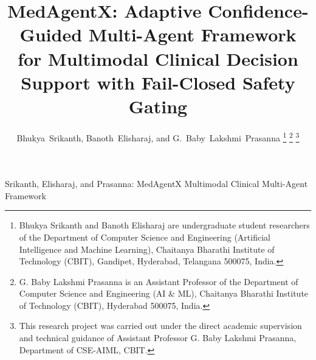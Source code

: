 \documentclass[journal,10pt,twocolumn]{IEEEtran}
\begin{document}
\title{MedAgentX: Adaptive Confidence-Guided Multi-Agent Framework for Multimodal Clinical Decision Support with Fail-Closed Safety Gating}

\author{Bhukya~Srikanth, Banoth~Elisharaj, and G.~Baby~Lakshmi~Prasanna%
\thanks{Bhukya Srikanth and Banoth Elisharaj are undergraduate student researchers of the Department of Computer Science and Engineering (Artificial Intelligence and Machine Learning), Chaitanya Bharathi Institute of Technology (CBIT), Gandipet, Hyderabad, Telangana 500075, India.}%
\thanks{G. Baby Lakshmi Prasanna is an Assistant Professor of the Department of Computer Science and Engineering (AI \& ML), Chaitanya Bharathi Institute of Technology (CBIT), Hyderabad 500075, India.}%
\thanks{This research project was carried out under the direct academic supervision and technical guidance of Assistant Professor G. Baby Lakshmi Prasanna, Department of CSE-AIML, CBIT.}%
}

%
{Srikanth, Elisharaj, and Prasanna: MedAgentX Multimodal Clinical Multi-Agent Framework}

\maketitle
\end{document}
